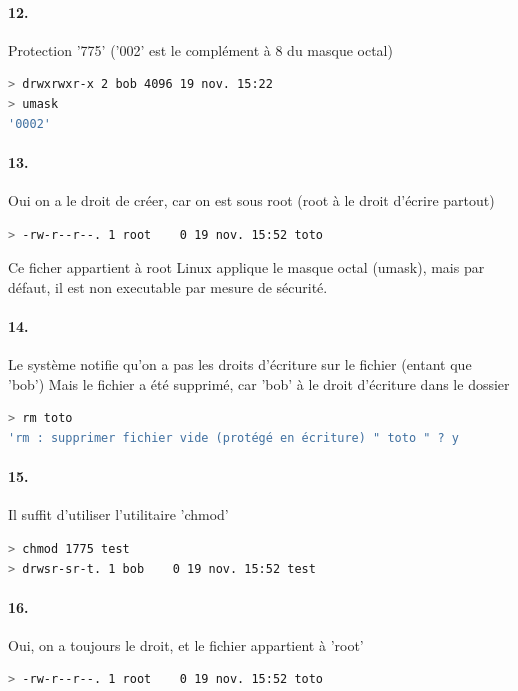 \documentclass[10pt]{article}
\begin{document}
        \paragraph{12.} Protection '775' ('002' est le complément à 8 du masque octal)

\begin{lstlisting}[language=bash]
> drwxrwxr-x 2 bob 4096 19 nov. 15:22
> umask
'0002'
\end{lstlisting}

        \paragraph{13.}
        
Oui on a le droit de créer, car on est sous root (root à le droit d'écrire partout)
\begin{lstlisting}[language=bash]
> -rw-r--r--. 1 root    0 19 nov. 15:52 toto
\end{lstlisting}

Ce ficher appartient à root
Linux applique le masque octal (umask), mais par défaut, il est non executable par mesure de sécurité.

\paragraph{14.} Le système notifie qu'on a pas les droits d'écriture sur le fichier (entant que 'bob')
Mais le fichier a été supprimé, car 'bob' à le droit d'écriture dans le dossier

\begin{lstlisting}[language=bash]
> rm toto
'rm : supprimer fichier vide (protégé en écriture) " toto " ? y
\end{lstlisting}
        
        \paragraph{15.} Il suffit d'utiliser l'utilitaire 'chmod'
        
\begin{lstlisting}[language=bash]
> chmod 1775 test
> drwsr-sr-t. 1 bob    0 19 nov. 15:52 test
\end{lstlisting}

        \paragraph{16.} Oui, on a toujours le droit, et le fichier appartient à 'root'
\begin{lstlisting}[language=bash]
> -rw-r--r--. 1 root    0 19 nov. 15:52 toto
\end{lstlisting}
 
\end{document}

